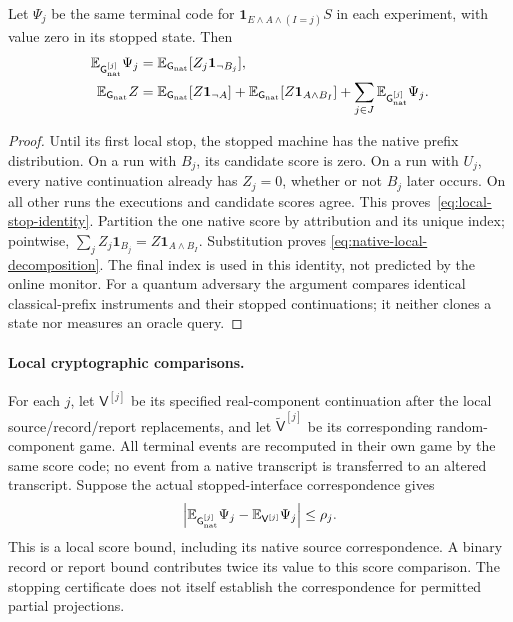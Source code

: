\begin{lemma}
\label{lem:native-local-score}
Let $\Psi_j$ be the same terminal code for
$\mathbf1_{E\land A\land(I=j)}S$ in each experiment, with value zero in its
stopped state.  Then
\begin{align}
 \mathbb E_{\mathsf G_{\rm nat}^{[j]}}\Psi_j
   &=\mathbb E_{\mathsf G_{\rm nat}}
           [Z_j\mathbf1_{\neg B_j}], \label{eq:local-stop-identity}\\
 \mathbb E_{\mathsf G_{\rm nat}}Z
   &=\mathbb E_{\mathsf G_{\rm nat}}[Z\mathbf1_{\neg A}]
     +\mathbb E_{\mathsf G_{\rm nat}}[Z\mathbf1_{A\land B_I}]
     +\sum_{j\in J}
       \mathbb E_{\mathsf G_{\rm nat}^{[j]}}\Psi_j.
       \label{eq:native-local-decomposition}
\end{align}
\end{lemma}
\begin{proof}
Until its first local stop, the stopped machine has the native prefix
distribution.  On a run with $B_j$, its candidate score is zero.  On a run
with $U_j$, every native continuation already has $Z_j=0$, whether or not
$B_j$ later occurs.  On all other runs the executions and candidate scores
agree.  This proves~\eqref{eq:local-stop-identity}.  Partition the one native
score by attribution and its unique index; pointwise,
$\sum_j Z_j\mathbf1_{B_j}=Z\mathbf1_{A\land B_I}$.  Substitution proves
\eqref{eq:native-local-decomposition}.  The final index is used in this
identity, not predicted by the online monitor.  For a quantum adversary the
argument compares identical classical-prefix instruments and their stopped
continuations; it neither clones a state nor measures an oracle query.
\end{proof}

\paragraph{Local cryptographic comparisons.}
For each $j$, let $\mathsf V^{[j]}$ be its specified real-component
continuation after the local source/record/report replacements, and let
$\widetilde{\mathsf V}^{[j]}$ be its corresponding random-component game.
All terminal events are recomputed in their own game by the same score code;
no event from a native transcript is transferred to an altered transcript.
Suppose the actual stopped-interface correspondence gives
\[
 \left|\mathbb E_{\mathsf G_{\rm nat}^{[j]}}\Psi_j
       -\mathbb E_{\mathsf V^{[j]}}\Psi_j\right|\le\rho_j.
\]
This is a local score bound, including its native source correspondence.
A binary record or report bound contributes twice its value to this score
comparison.  The stopping certificate does not itself establish the
correspondence for permitted partial projections.

